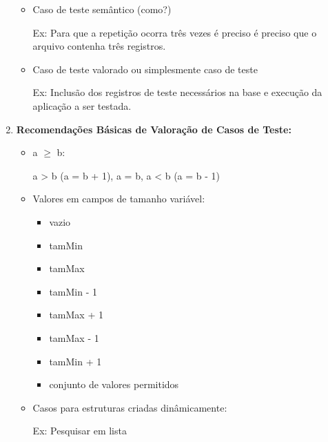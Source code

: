 \documentclass[
	12pt, %
]{fphw}
\begin{document}
\begin{doublespace}
\begin{enumerate}[label=\textbf{\arabic*)}]
\begin{itemize}
                  \item Caso de teste semântico (como?)

                        Ex: Para que a repetição ocorra três vezes é preciso é preciso que o arquivo contenha três registros.

                  \item Caso de teste valorado ou simplesmente caso de teste

                        Ex: Inclusão dos registros de teste necessários na base e execução da aplicação a ser testada.

              \end{itemize}

        \item \textbf{Recomendações Básicas de Valoração de Casos de Teste:}

              \begin{itemize}

                  \item a $\geq$ b:

                        a > b (a = b + 1), a = b, a < b (a = b - 1)

                  \item Valores em campos de tamanho variável:

                        \begin{itemize}
                            \item vazio
                            \item tamMin
                            \item tamMax
                            \item tamMin - 1
                            \item tamMax + 1
                            \item tamMax - 1
                            \item tamMin + 1
                            \item conjunto de valores permitidos
                        \end{itemize}

                  \item Casos para estruturas criadas dinâmicamente:

                        Ex: Pesquisar em lista

                        \begin{itemize}


\end{itemize}
\end{itemize}
\end{enumerate}
\end{doublespace}
\end{document}
